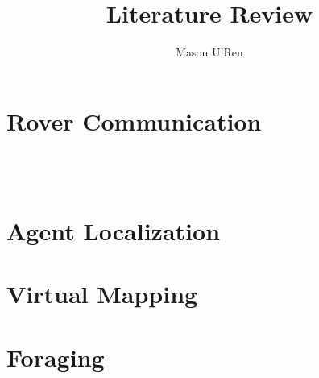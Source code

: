 \documentclass[]{article}
\title{Literature Review}
\author{Mason U'Ren}
\begin{document}
\maketitle

\section{Rover Communication}
 \\ \\


\section{Agent Localization}


\section{Virtual Mapping}


\section{Foraging}





\end{document}
